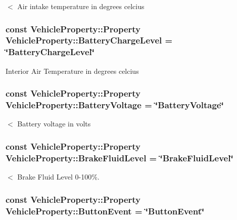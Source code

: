 $<$ Air intake temperature in degrees celcius \hypertarget{classVehicleProperty_a71025201c20a84f3303b32b08872113a}{
\subsubsection[{Battery\-Charge\-Level}]{\setlength{\rightskip}{0pt plus 5cm}const Vehicle\-Property\-::\-Property Vehicle\-Property\-::\-Battery\-Charge\-Level = \char`\"{}Battery\-Charge\-Level\char`\"{}\hspace{0.3cm}{\ttfamily [static]}}}\label{classVehicleProperty_a71025201c20a84f3303b32b08872113a}
Interior Air Temperature in degrees celcius \hypertarget{classVehicleProperty_a43a70a277b955ae35a9ba795d2052591}{
\subsubsection[{Battery\-Voltage}]{\setlength{\rightskip}{0pt plus 5cm}const Vehicle\-Property\-::\-Property Vehicle\-Property\-::\-Battery\-Voltage = \char`\"{}Battery\-Voltage\char`\"{}\hspace{0.3cm}{\ttfamily [static]}}}\label{classVehicleProperty_a43a70a277b955ae35a9ba795d2052591}
$<$ Battery voltage in volts \hypertarget{classVehicleProperty_a83bc635222e9ba14dfa134defa21e825}{
\subsubsection[{Brake\-Fluid\-Level}]{\setlength{\rightskip}{0pt plus 5cm}const Vehicle\-Property\-::\-Property Vehicle\-Property\-::\-Brake\-Fluid\-Level = \char`\"{}Brake\-Fluid\-Level\char`\"{}\hspace{0.3cm}{\ttfamily [static]}}}\label{classVehicleProperty_a83bc635222e9ba14dfa134defa21e825}
$<$ Brake Fluid Level 0-\/100\%. \hypertarget{classVehicleProperty_ab9fa252d209fbd2eb014c4d934d3d615}{
\subsubsection[{Button\-Event}]{\setlength{\rightskip}{0pt plus 5cm}const Vehicle\-Property\-::\-Property Vehicle\-Property\-::\-Button\-Event = \char`\"{}Button\-Event\char`\"{}\hspace{0.3cm}{\ttfamily [static]}}}\label{classVehicleProperty_ab9fa252d209fbd2eb014c4d934d3d615}
